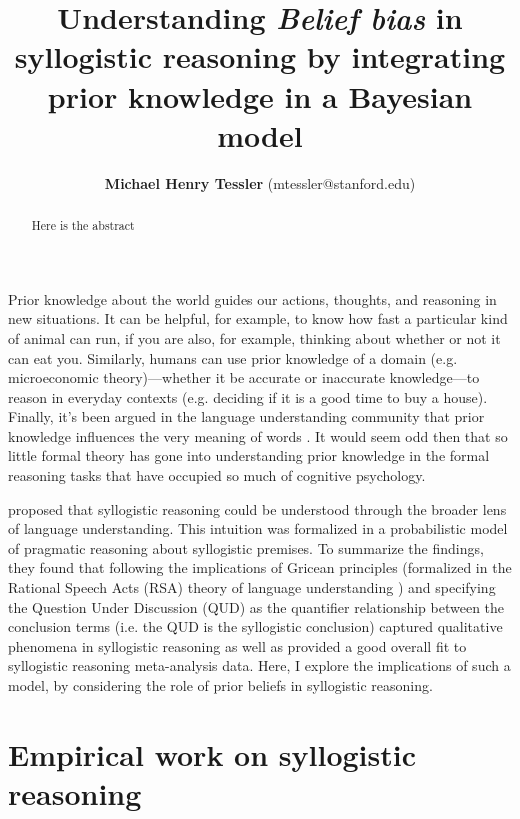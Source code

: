 \documentclass{llncs} %
\title{Understanding \emph{Belief bias} in syllogistic reasoning by integrating prior knowledge in a Bayesian model}
\author{{\large \bf Michael Henry Tessler} (mtessler@stanford.edu)}
\institute{Department of Psychology, Stanford University}
\begin{document}
\maketitle


\begin{abstract}
Here is the abstract
\end{abstract}

Prior knowledge about the world guides our actions, thoughts, and reasoning in new situations. It can be helpful, for example, to know how fast a particular kind of animal can run, if you are also, for example, thinking about whether or not it can eat you. Similarly, humans can use prior knowledge of a domain (e.g. microeconomic theory)---whether it be accurate or inaccurate knowledge---to reason in everyday contexts  (e.g. deciding if it is a good time to buy a house). Finally, it's been argued in the language understanding community that prior knowledge influences the very meaning of words \cite{LassGood2015}. It would seem odd then that so little formal theory has gone into understanding prior knowledge in the formal reasoning tasks that have occupied so much of cognitive psychology. 

 proposed that syllogistic reasoning could be understood through the broader lens of language understanding. This intuition was formalized in a probabilistic model of pragmatic reasoning about syllogistic premises. To summarize the findings, they found that following the implications of Gricean principles (formalized in the Rational Speech Acts (RSA) theory of language understanding \cite{Frank2012,Goodman2013}) and specifying the Question Under Discussion (QUD) as the quantifier relationship between the conclusion terms (i.e. the QUD is the syllogistic conclusion) captured qualitative phenomena in syllogistic reasoning as well as provided a good overall fit to syllogistic reasoning meta-analysis data. Here, I explore the implications of such a model, by considering the role of prior beliefs in syllogistic reasoning.

\section{Empirical work on syllogistic reasoning}
\end{document}
